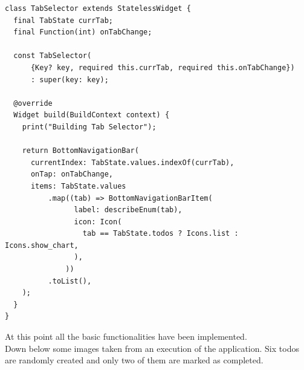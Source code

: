 \begin{verbatim}
class TabSelector extends StatelessWidget {
  final TabState currTab;
  final Function(int) onTabChange;

  const TabSelector(
      {Key? key, required this.currTab, required this.onTabChange})
      : super(key: key);

  @override
  Widget build(BuildContext context) {
    print("Building Tab Selector");

    return BottomNavigationBar(
      currentIndex: TabState.values.indexOf(currTab),
      onTap: onTabChange,
      items: TabState.values
          .map((tab) => BottomNavigationBarItem(
                label: describeEnum(tab),
                icon: Icon(
                  tab == TabState.todos ? Icons.list : Icons.show_chart,
                ),
              ))
          .toList(),
    );
  }
}

\end{verbatim}

 
At this point all the basic functionalities have been implemented. \\
Down below some images taken from an execution of the application. Six todos are randomly created and only two of them are marked as completed.

